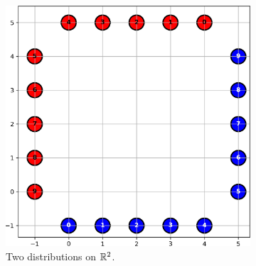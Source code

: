 \begin{figure}[p]
    \centering
    \begin{subfigure}[c]{0.4\textwidth}
    \centering
        \includegraphics[width=\linewidth]{samples/1/easy_distributions.png}
        \caption{Two distributions on $\mathbb{R}^2$.}
        \label{fig:easy_dist}
    \end{subfigure}
    \hfill
    \begin{subfigure}[c]{0.5\textwidth}
    \centering

\end{subfigure}
\end{figure}
